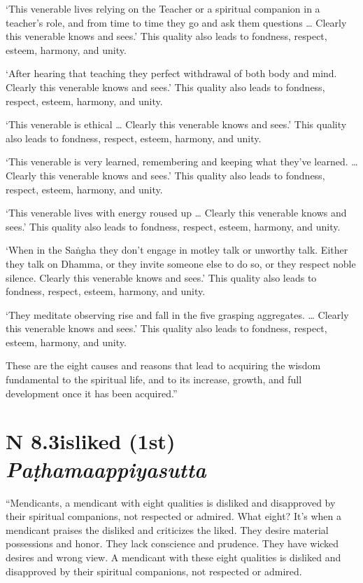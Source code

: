\documentclass[12pt,openany]{book}%
\newcommand*{\suttatitleacronym}[1]{\smaller[2]{#1}\vspace*{.3em}}
\newcommand*{\suttatitletranslation}[1]{\linebreak{#1}}
\newcommand*{\suttatitleroot}[1]{\linebreak\smaller[2]\itshape{#1}}
\newcommand*{\tocacronym}[1]{\hspace*{-3.3em}{#1}\quad}
\newcommand*{\toctranslation}[1]{#1}
\newcommand*{\tocroot}[1]{(\textit{#1})}
\begin{document}
‘This venerable lives relying on the Teacher or a spiritual companion in a teacher’s role, and from time to time they go and ask them questions … Clearly this venerable knows and sees.’ This quality also leads to fondness, respect, esteem, harmony, and unity. 

‘After hearing that teaching they perfect withdrawal of both body and mind. Clearly this venerable knows and sees.’ This quality also leads to fondness, respect, esteem, harmony, and unity. 

‘This venerable is ethical … Clearly this venerable knows and sees.’ This quality also leads to fondness, respect, esteem, harmony, and unity. 

‘This venerable is very learned, remembering and keeping what they’ve learned. … Clearly this venerable knows and sees.’ This quality also leads to fondness, respect, esteem, harmony, and unity. 

‘This venerable lives with energy roused up … Clearly this venerable knows and sees.’ This quality also leads to fondness, respect, esteem, harmony, and unity. 

‘When in the \textsanskrit{Saṅgha} they don’t engage in motley talk or unworthy talk. Either they talk on Dhamma, or they invite someone else to do so, or they respect noble silence. Clearly this venerable knows and sees.’ This quality also leads to fondness, respect, esteem, harmony, and unity. 

‘They meditate observing rise and fall in the five grasping aggregates. … Clearly this venerable knows and sees.’ This quality also leads to fondness, respect, esteem, harmony, and unity. 

These are the eight causes and reasons that lead to acquiring the wisdom fundamental to the spiritual life, and to its increase, growth, and full development once it has been acquired.” 

%
\section*{{\suttatitleacronym AN 8.3}{\suttatitletranslation Disliked (1st) }{\suttatitleroot Paṭhamaappiyasutta}}
\addcontentsline{toc}{section}{\tocacronym{AN 8.3} \toctranslation{Disliked (1st) } \tocroot{Paṭhamaappiyasutta}}

“Mendicants, a mendicant with eight qualities is disliked and disapproved by their spiritual companions, not respected or admired. What eight? It’s when a mendicant praises the disliked and criticizes the liked. They desire material possessions and honor. They lack conscience and prudence. They have wicked desires and wrong view. A mendicant with these eight qualities is disliked and disapproved by their spiritual companions, not respected or admired. 
\end{document}
